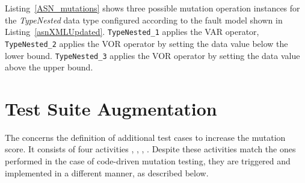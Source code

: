 




Listing~\ref{ASN_mutations} shows three possible mutation operation instances for the \emph{TypeNested} data type configured according to the fault model shown in Listing~\ref{asnXMLUpdated}.
\texttt{TypeNested\_1} applies the VAR operator,
 \texttt{TypeNested\_2} applies the VOR operator by setting the data value below the lower bound.
 \texttt{TypeNested\_3} applies the VOR operator by setting the data value above the upper bound.



\clearpage



\clearpage
\section{Test Suite Augmentation} %
\label{sec:data:test_suite_augmentation}

\STARTCHANGEDWPT

The  concerns the definition of additional test cases to increase the mutation score.
It consists of four activities , , , . 
Despite these activities match the ones performed in the case of code-driven mutation testing, they are triggered and implemented in a different manner, as described below.


